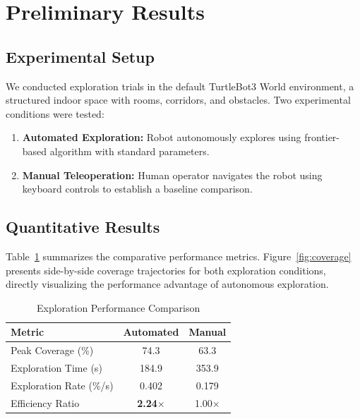 \documentclass[conference]{IEEEtran}
\begin{document}
\section{Preliminary Results}

\subsection{Experimental Setup}

We conducted exploration trials in the default TurtleBot3 World environment, a structured indoor space with rooms, corridors, and obstacles. Two experimental conditions were tested:

\begin{enumerate}
    \item \textbf{Automated Exploration:} Robot autonomously explores using frontier-based algorithm with standard parameters.
    \item \textbf{Manual Teleoperation:} Human operator navigates the robot using keyboard controls to establish a baseline comparison.
\end{enumerate}

\subsection{Quantitative Results}

Table~\ref{tab:results} summarizes the comparative performance metrics. Figure~\ref{fig:coverage} presents side-by-side coverage trajectories for both exploration conditions, directly visualizing the performance advantage of autonomous exploration.

\begin{table}[h]
\centering
\caption{Exploration Performance Comparison}
\label{tab:results}
\begin{tabular}{lcc}
\toprule
\textbf{Metric} & \textbf{Automated} & \textbf{Manual} \\
\midrule
Peak Coverage (\%) & 74.3 & 63.3 \\
Exploration Time (s) & 184.9 & 353.9 \\
Exploration Rate (\%/s) & 0.402 & 0.179 \\
Efficiency Ratio & \textbf{2.24$\times$} & 1.00$\times$ \\
\bottomrule
\end{tabular}
\end{table}
\end{document}
